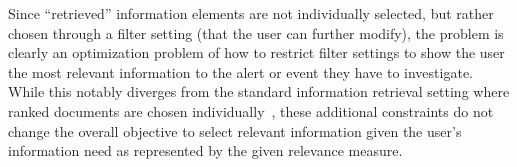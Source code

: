 Since ``retrieved'' information
elements are not individually selected, but rather chosen through
a filter setting (that the user can further modify), the problem is clearly 
an optimization problem of how to restrict filter settings to show
the user the most relevant information to the alert or event they have to investigate.
While this notably diverges from the standard information retrieval setting
where ranked documents are chosen individually~\cite{Baeza-Yates2010}, these additional constraints
do not change the overall objective to select
relevant information given the user's information need as represented by the given relevance measure. 

